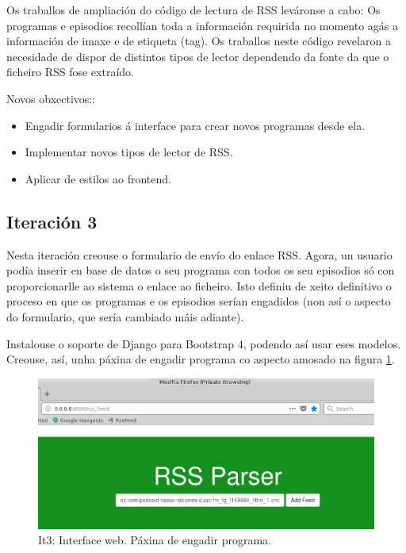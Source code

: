 Os traballos de ampliación do código de lectura de RSS leváronse a cabo: Os programas e episodios recollían toda a información requirida no momento agás a información de imaxe e de etiqueta (tag). Os traballos neste código revelaron a necesidade de dispor de distintos tipos de lector dependendo da fonte da que o ficheiro RSS fose extraído. 

Novos obxectivos:: 

\begin{itemize}
	\item Engadir formularios á interface para crear novos programas desde ela.
	\item Implementar novos tipos de lector de RSS.
	\item Aplicar  de estilos ao frontend. 
\end{itemize}

\subsection{Iteración 3}

Nesta iteración creouse o formulario de envío do enlace RSS. Agora, un usuario podía inserir en base de datos o seu programa con todos os seu episodios só con proporcionarlle ao sistema o enlace ao ficheiro. Isto definiu de xeito definitivo o proceso en que os programas e os episodios serían engadidos (non así o aspecto do formulario, que sería cambiado máis adiante).

Instalouse o soporte de Django para Bootstrap 4, podendo así usar eses modelos. Creouse, así, unha páxina de engadir programa co aspecto amosado na figura \ref{fig:it3_add_program}.

\begin{figure}[h]
	\centering
	\includegraphics[scale=0.5,keepaspectratio=true]{./images/it3_add_program.png}
	\caption{It3: Interface web. Páxina de engadir programa.}
	\label{fig:it3_add_program}
\end{figure}


